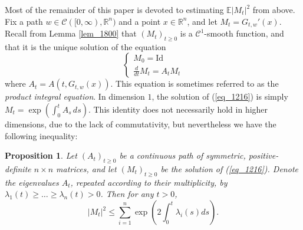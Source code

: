 \documentclass[12pt,a4paper]{article}
\newcommand{\E}{\mathbb{E}}
\newcommand{\RR}{\mathbb{R}}
\newcommand{\R}{\mathbb{R}}
\newcommand{\id}{\mathrm{Id}}
\newtheorem{proposition}[theorem]{Proposition}
\theoremstyle{definition}
\begin{document}
Most of the remainder of this paper is devoted to estimating $\E \vert M_t \vert^2$ from above. 
Fix a  path $w\in \mathcal C ( [0,\infty) , \R^n )$
and a point $x\in \R^n$, and let $M_t = G_{t,w}'(x)$. Recall from Lemma \ref{lem_1800}
that $(M_t)_{t \geq 0}$ is a $\mathcal C^1$-smooth
function, and that it is the unique solution of the equation
\begin{equation} \label{eq_1216}
\begin{cases}
M_0 = \id \\
\frac d{dt} M_t = A_t M_t
\end{cases}
\end{equation}
where $A_t = A(t, G_{t,w} (x) )$. This equation is
sometimes referred to as the \emph{product integral equation}. In dimension $1$, the solution of (\ref{eq_1216}) is
simply $M_t = \exp ( \int_0^t A_s \,ds )$. This identity does not necessarily hold
in higher dimensions, due to the lack of commutativity,
but nevertheless we  have the following inequality:
%
\begin{proposition}\label{prop_1813}
Let $(A_t)_{t \geq 0}$ be a continuous path
of symmetric, positive-definite $n \times n$ matrices, and let $(M_t)_{t \geq 0}$ be the
 solution of (\ref{eq_1216}). Denote
the eigenvalues $A_t$, repeated according to their multiplicity, by $\lambda_{1}(t) \geq \ldots \geq \lambda_{n}(t) > 0$. Then for any $t > 0$,
\begin{equation} \vert M_t \vert^2 \leq \sum_{i=1}^n \exp \left( 2 \int_0^t \lambda_{i}(s) ds \right) .
\label{eq_1357} \end{equation}
\end{proposition}
\end{document}
